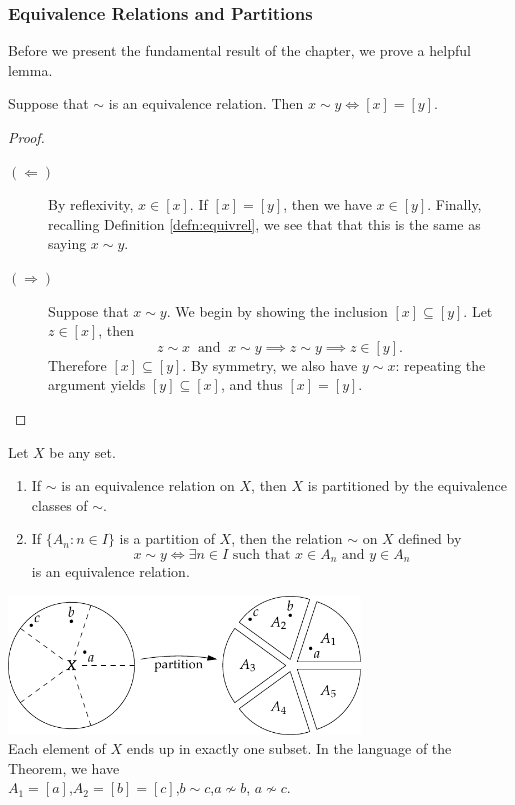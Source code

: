 \subsubsection*{Equivalence Relations and Partitions}

Before we present the fundamental result of the chapter, we prove a helpful lemma.

\begin{lemm}\label{lemm:preequiv}
Suppose that $\sim$ is an equivalence relation. Then $x\sim y\iff [x]=[y]$.
\end{lemm}

\begin{proof}
\begin{description}
\item[$(\Leftarrow)$]\quad By reflexivity, $x\in[x]$. If $[x]=[y]$, then we have $x\in[y]$. Finally, recalling Definition \ref{defn:equivrel}, we see that that this is the same as saying $x\sim y$.
\item[$(\Rightarrow)$]\quad Suppose that $x\sim y$. We begin by showing the inclusion $[x]\subseteq [y]$. Let $z\in[x]$, then
\[z\sim x\ \text{ and }\ x\sim y\implies z\sim y\implies z\in[y].\tag*{(Transitivity)}\]
Therefore $[x]\subseteq[y]$. By symmetry, we also have $y\sim x$: repeating the argument yields $[y]\subseteq [x]$, and thus $[x]=[y]$.\qedhere
\end{description}
\end{proof}

\begin{thm}\label{thm:equivpart}
Let $X$ be any set.
\begin{enumerate}
\item If $\sim$ is an equivalence relation on $X$, then $X$ is partitioned by the equivalence classes of $\sim$.
\item If $\{A_n:n\in I\}$ is a partition of $X$, then the relation $\sim$ on $X$ defined by
\[x\sim y\iff \exists n\in I\text{ such that $x\in A_n$ and }y\in A_n\]
is an equivalence relation.
\end{enumerate}
\end{thm}

\begin{center}
\includegraphics[width=0.7\textwidth]{relations-08-part}\\
Each element of $X$ ends up in exactly one subset. In the language of the Theorem, we have\\[5pt]
$A_1=[a]$,\quad $A_2=[b]=[c]$,\quad $b\sim c$,\quad $a\nsim b$, \quad $a\nsim c$.
\end{center}

